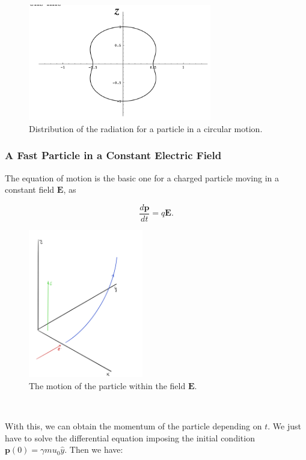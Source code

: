 \begin{figure}[h!]
	\includegraphics[width=8cm]{figures/RadiatingJackson2.png}
	\centering
	\caption{Distribution of the radiation for a particle in a circular motion.}
\end{figure}

\subsubsection{A Fast Particle in a Constant Electric Field}\label{A Fast Particle in a Constant Electric Field}

The equation of motion is the basic one for a charged particle moving in a constant field $\mathbf{E}$, as

\begin{equation}
	\frac{d \mathbf{p}}{d t}=q \mathbf{E} .
\end{equation}

\begin{figure}[h]
	\includegraphics[width=5cm]{figures/FastParticle.png}
	\centering
	\caption{The motion of the particle within the field $\mathbf{E}$.}
\end{figure}\

With this, we can obtain the momentum of the particle depending on $t$. We just have to solve the differential equation imposing the initial condition $\mathbf{p}(0) = \gamma m u_{0} \hat{y}$. Then we have:

